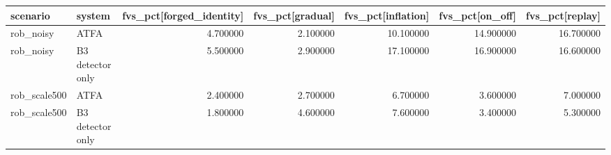 \begin{tabular}{llrrrrr}
\toprule
scenario & system & fvs\_pct[forged\_identity] & fvs\_pct[gradual] & fvs\_pct[inflation] & fvs\_pct[on\_off] & fvs\_pct[replay] \\
\midrule
rob\_noisy & ATFA & 4.700000 & 2.100000 & 10.100000 & 14.900000 & 16.700000 \\
rob\_noisy & B3 detector only & 5.500000 & 2.900000 & 17.100000 & 16.900000 & 16.600000 \\
rob\_scale500 & ATFA & 2.400000 & 2.700000 & 6.700000 & 3.600000 & 7.000000 \\
rob\_scale500 & B3 detector only & 1.800000 & 4.600000 & 7.600000 & 3.400000 & 5.300000 \\
\bottomrule
\end{tabular}
